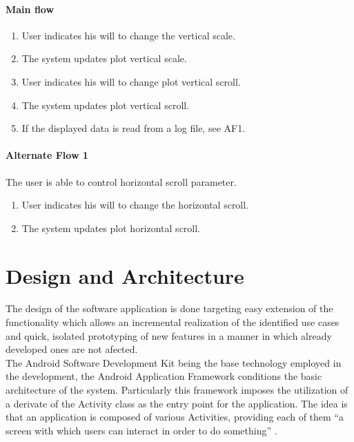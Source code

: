 			\paragraph{Main flow}
				\begin{enumerate}
				\item User indicates his will to change the vertical scale.
				\item The system updates plot vertical scale.
				\item User indicates his will to change plot vertical scroll.
				\item The system updates plot vertical scroll.
				\item If the displayed data is read from a log file, see AF1.
				\end{enumerate}
			
			\paragraph{Alternate Flow 1} The user is able to control horizontal scroll parameter.	
				\begin{enumerate}
				\item User indicates his will to change the horizontal scroll.
				\item The system updates plot horizontal scroll.
				\end{enumerate}

	\section{Design and Architecture}
	\label{sec:sw-arch}
	

		The design of the software application is done targeting easy extension of the functionality which allows an incremental realization of the identified use cases and quick, isolated prototyping of new features in a manner in which already developed ones are not afected.\\

		The Android Software Development Kit being the base technology employed in the development, the Android Application Framework conditions the basic architecture of the system. Particularly this framework imposes the utilization of a derivate of the Activity class as the entry point for the application. The idea is that an application is composed of various Activities, providing each of them ``a screen with which users can interact in order to do something'' \cite{andev-activity}.\\

